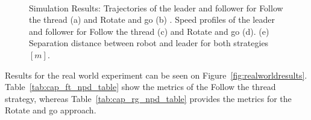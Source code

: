 \documentclass[journal]{IEEEtran}
\begin{document}
\begin{figure}
    \\
    \vspace*{-2.5em}
  \caption{Simulation Results: Trajectories of the leader and follower for Follow the thread (a) and Rotate and go (b) . 
        Speed profiles of the leader and follower for Follow the thread (c) and Rotate and go (d). 
        (e) Separation distance between robot and leader for both strategies  $[m]$.}
  \label{fig:simulationresults} 
\end{figure}



Results for the real world experiment can be seen on Figure~\ref{fig:realworldresults}.   Table~\ref{tab:cap_ft_npd_table} show the metrics of the Follow the thread strategy, whereas Table~\ref{tab:cap_rg_npd_table} provides the metrics for the Rotate and go approach.

%
%
%
%
%
%
%
%
\end{document}
